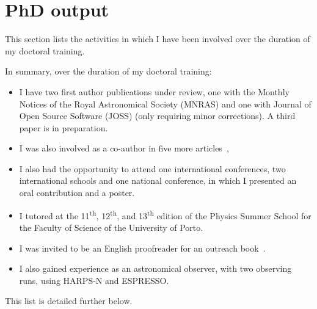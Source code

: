 \chapter{PhD output}\label{appendix:phd_output}

This section lists the activities in which I have been involved over the duration of my doctoral training.

In summary, over the duration of my doctoral training:
\begin{itemize}
    \item I have two first author publications under review, one with the Monthly Notices of the Royal Astronomical Society (MNRAS) and one with Journal of Open Source Software (JOSS) (only requiring minor corrections).
    A third paper is in preparation. %
    \item I was also involved as a co-author in five more articles~\citep{figueira_radial_2016, barros_precise_2017, santerne_earthsized_2018, lillo-box_troy_2018, ulmer-moll_telluric_2018},
    \item I also had the opportunity to attend one international conferences, two international schools and one national conference, in which I presented an oral contribution and a poster.
    \item I tutored at the 11\textsuperscript{th}, 12\textsuperscript{th}, and 13\textsuperscript{th} edition of the Physics Summer School for the Faculty of Science of the University of Porto.
    \item I was invited to be an English proofreader for an outreach book~\citet{figueira_astro_2015}.
    \item I also gained experience as an astronomical observer, with two observing runs, using {HARPS-N} and {ESPRESSO}.
\end{itemize}

This list is detailed further below.

\clearpage


\clearpage


\clearpage


\clearpage


\clearpage


\clearpage


\clearpage
